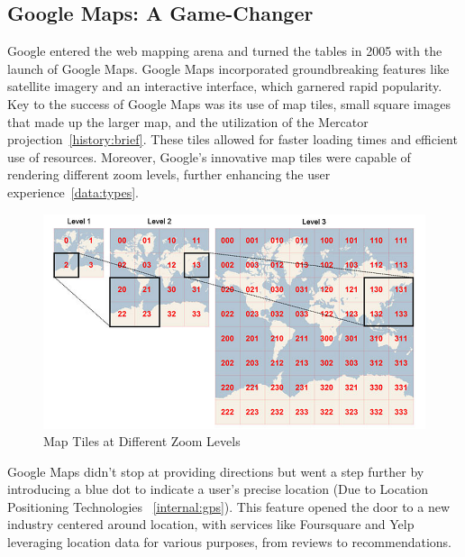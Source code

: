 \documentclass[10pt,oneside,english,a4paper]{article}
\begin{document}
\subsection{Google Maps: A Game-Changer} \label{history:gamechanger}
Google entered the web mapping arena and turned the tables in 2005 with the launch of Google Maps. Google Maps incorporated groundbreaking features like satellite imagery and an interactive interface, which garnered rapid popularity. 
\\Key to the success of Google Maps was its use of map tiles, small square images that made up the larger map, and the utilization of the Mercator projection~\ref{history:brief}. These tiles allowed for faster loading times and efficient use of resources. Moreover, Google's innovative map tiles were capable of rendering different zoom levels, further enhancing the user experience~\ref{data:types}. 

\begin{figure}[h]
	\centering
	\includegraphics[scale=0.35]{diagram5.png}
	\caption{Map Tiles at Different Zoom Levels}
	\label{fig:tiles}
\end{figure}

Google Maps didn't stop at providing directions but went a step further by introducing a blue dot to indicate a user's precise location (Due to Location Positioning Technologies ~\ref{internal:gps}). This feature opened the door to a new industry centered around location, with services like Foursquare and Yelp leveraging location data for various purposes, from reviews to recommendations.
\end{document}
